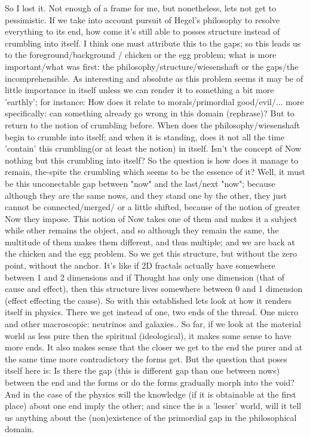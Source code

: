 \documentclass{book}
\begin{document}
So I lost it. Not enough of a frame for me, but nonetheless, lets not get to pessimistic. If we take into account pursuit of Hegel's philosophy to resolve everything to its end, how come it's still able to posses structure instead of crumbling into itself. I think one must attribute this to the gaps; so this leads us to the foreground/background / chicken or the egg problem; what is more important/what was first: the philosophy/structure/wiesenshaft or the gaps/the incomprehensible.
As interesting and absolute as this problem seems it may be of little importance in itself unless we can render it to something a bit more 'earthly'; for instance: How does it relate to morals/primordial good/evil/... more specifically: can something already go wrong in this domain (rephrase)?
But to return to the notion of crumbling before. When does the philosophy/wiesenshaft begin to crumble into itself; and when it is standing, does it not all the time 'contain' this crumbling(or at least the notion) in itself. Isn't the concept of Now nothing but this crumbling into itself? So the question is how does it manage to remain, the-spite the crumbling which seems to be the essence of it? Well, it must be this unconectable gap between "now" and the last/next "now"; because although they are the same nows, and they stand one by the other, they just cannot be connected/merged/ or a little shifted, because of the notion of greater Now they impose. This notion of Now takes one of them and makes it a subject while other remains the object, and so although they remain the same, the multitude of them makes them different, and thus multiple; and we are back at the chicken and the egg problem. So we get this structure, but without the zero point, without the anchor. It's like if 2D fractals actually have somewhere between 1 and 2 dimensions and if Thought has only one dimension (that of cause and effect), then this structure lives somewhere between 0 and 1 dimension (effect effecting the cause). 
So with this established lets look at how it renders itself in physics. There we get instead of one, two ends of the thread. One micro and other macroscopic: neutrinos and galaxies.. So far, if we look at the material world as less pure then the spiritual (ideological), it makes some sense to have more ends. It also makes sense that the closer we get to the end the purer and at the same time more contradictory the forms get. But the question that poses itself here is: Is there the gap (this is different gap than one between nows) between the end and the forms or do the forms gradually morph into the void? And in the case of the physics will the knowledge (if it is obtainable at the first place) about one end imply the other; and since the is a 'lesser' world, will it tell us anything about the (non)existence of the primordial gap in the philosophical domain.
\end{document}
